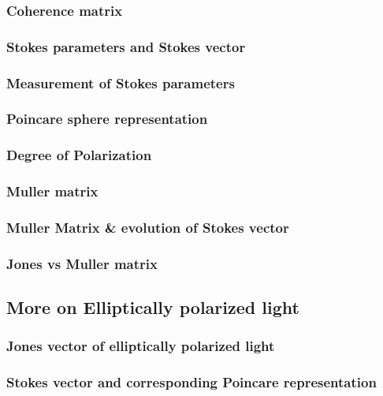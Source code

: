 \documentclass[11pt,a4paper]{article}
\begin{document}
\subsubsection{Coherence matrix}

\subsubsection{Stokes parameters and Stokes vector}

\subsubsection{Measurement of Stokes parameters}

\subsubsection{Poincare sphere representation}

\subsubsection{Degree of Polarization}

\subsubsection{Muller matrix}

\subsubsection{Muller Matrix \& evolution of Stokes vector}

\subsubsection{Jones vs Muller matrix}

\subsection{More on Elliptically polarized light}
\subsubsection{Jones vector of elliptically polarized light}

\subsubsection{Stokes vector and corresponding Poincare representation}
\end{document}
